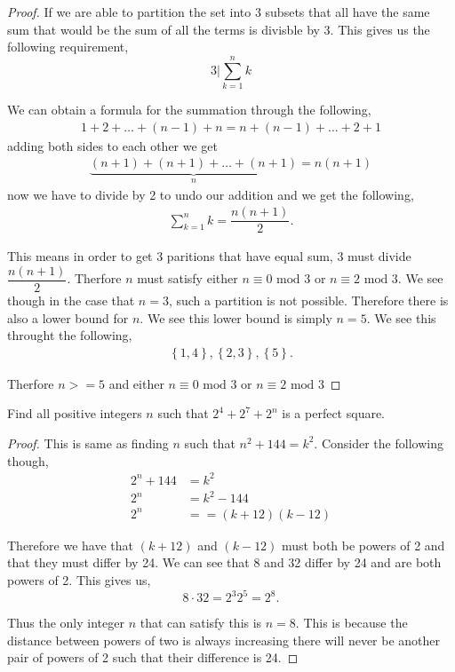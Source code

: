 \documentclass[11pt]{article}
\newenvironment{problem}[2][Problem\!]{\begin{trivlist}
\item[\hskip \labelsep {\bfseries #1}\hskip \labelsep {\bfseries #2}]}{\end{trivlist}}
\newcommand{\set}[1]{\left\{#1\right\}} %
\begin{document}
\begin{proof}
    If we are able to partition the set into 3 subsets that all have the same sum that would be the sum of all the terms is divisble by 3. This gives us the following requirement, \[3|\sum_{k =1}^{n}k\]

    We can obtain a formula for the summation through the following,
    \begin{align*}
        1 + 2 + \dots + (n-1) + n = n + (n-1) + \dots + 2 + 1
    \end{align*}
    adding both sides to each other we get 
    \begin{align*}
        \underbrace{(n+1) + (n+1) + \dots + (n+1)}_{n} = n(n+1)
    \end{align*}
    now we have to divide by 2 to undo our addition and we get the following,
    \begin{align*}
        \sum_{k = 1}^{n}k = \dfrac{n(n+1)}{2}.
    \end{align*}

    This means in order to get 3 paritions that have equal sum, 3 must divide $\dfrac{n(n+1)}{2}$. Therfore $n$ must satisfy either $n \equiv 0 \text{ mod }3$ or $n \equiv 2 \text{ mod }3$. We see though in the case that $n = 3$, such a partition is not possible. Therefore there is also a lower bound for $n$. We see this lower bound is simply $n = 5$. We see this throught the following, 
    \begin{align}
        \set{1,4}, \set{2,3}, \set{5}.
    \end{align}

    Therfore $n >=5$ and either $n \equiv 0 \text{ mod }3$ or $n \equiv 2 \text{ mod }3$
\end{proof}

\begin{tcolorbox}
    \begin{problem} {IC | 11/12 | 143.}
        Find all positive integers $n$ such that $2^{4} + 2^{7} + 2^{n}$ is a perfect square. 
    \end{problem}
\end{tcolorbox}
\begin{proof}
    This is same as finding $n$ such that $n^{2} + 144 = k^{2}$. Consider the following though,
    \begin{align*}
        2^{n} + 144 &= k^{2} \\
        2^{n} &= k^{2} - 144 \\
        2^{n} &= = (k + 12)(k-12)
    \end{align*}

    Therefore we have that $(k+12)$ and $(k-12)$ must both be powers of 2 and that they must differ by 24. We can see that 8 and 32 differ by 24 and are both powers of 2. This gives us,
    \[8 \cdot 32 = 2^{3}2^{5} = 2^{8}.\]

    Thus the only integer $n$ that can satisfy this is $n = 8$. This is because the distance between powers of two is always increasing there will never be another pair of powers of 2 such that their difference is 24. 
\end{proof}
\newpage
\end{document}
